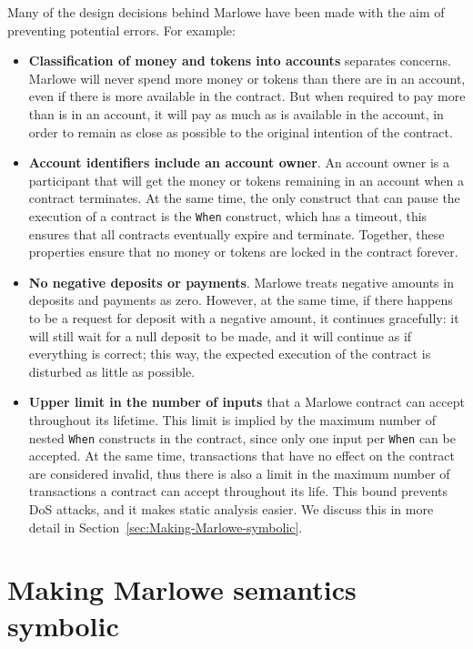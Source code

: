 \documentclass[english,runningheads]{llncs}
\begin{document}
Many of the design decisions behind Marlowe have been made with the
aim of preventing potential errors. For example:
\begin{itemize}
\item \textbf{Classification of money and tokens into accounts} separates concerns.
Marlowe will never spend more money or tokens than there are in an
account, even if there is more available in the contract. But when
required to pay more than is in an account, it will pay as much as
is available in the account, in order to remain as close as possible
to the original intention of the contract.
\item \textbf{Account identifiers include an account owner}. An account owner
is a participant that will get the money or tokens remaining in an account
when a contract terminates. At the same time, the only construct that
can pause the execution of a contract is the \texttt{When} construct,
which has a timeout, this ensures that all contracts eventually expire
and terminate. Together, these properties ensure that no money or tokens
are locked in the contract forever.
\item \textbf{No negative deposits or payments}. Marlowe treats negative
amounts in deposits and payments as zero. However, at the same time,
if there happens to be a request for deposit with a negative amount,
it continues gracefully: it will still wait for a null deposit to
be made, and it will continue as if everything is correct; this way,
the expected execution of the contract is disturbed as little as possible.
\item \textbf{Upper limit in the number of inputs} that a Marlowe contract
can accept throughout its lifetime. This limit is implied by the maximum
number of nested \texttt{When} constructs in the contract, since only one input
per \texttt{When} can be accepted. At the same time, transactions that have
no effect on the contract are considered invalid, thus there is also
a limit in the maximum number of transactions a contract can accept
throughout its life. This bound prevents DoS attacks, and it makes static analysis
easier. We discuss this in more detail in Section~\ref{sec:Making-Marlowe-symbolic}.
\end{itemize}

\section{Making Marlowe semantics symbolic\label{sec:Making-Marlowe-symbolic}}
\end{document}
